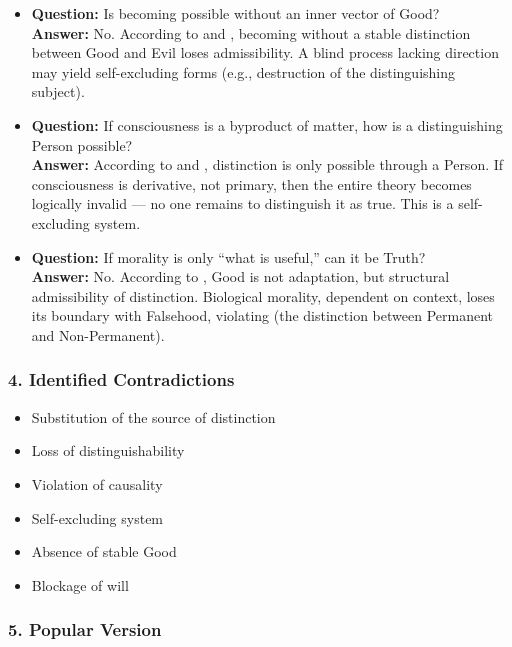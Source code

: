\documentclass[12pt]{article}
\begin{document}
\begin{itemize}
\item \textbf{Question:} Is becoming possible without an inner vector of Good?\\
\textbf{Answer:} No. According to \text{[4.3]} and \text{[11.2.3]}, becoming without a stable distinction between Good and Evil loses admissibility. A blind process lacking direction may yield self-excluding forms (e.g., destruction of the distinguishing subject).

\item \textbf{Question:} If consciousness is a byproduct of matter, how is a distinguishing Person possible?\\
\textbf{Answer:} According to \text{[10.4]} and \text{[5.1]}, distinction is only possible through a Person. If consciousness is derivative, not primary, then the entire theory becomes logically invalid — no one remains to distinguish it as true. This is a self-excluding system.

\item \textbf{Question:} If morality is only ``what is useful,'' can it be Truth?\\
\textbf{Answer:} No. According to \text{[11.2.3]}, Good is not adaptation, but structural admissibility of distinction. Biological morality, dependent on context, loses its boundary with Falsehood, violating \text{[4.4]} (the distinction between Permanent and Non-Permanent).
\end{itemize}

\subsubsection*{4. Identified Contradictions}

\begin{itemize}
\item Substitution of the source of distinction
\item Loss of distinguishability
\item Violation of causality
\item Self-excluding system
\item Absence of stable Good
\item Blockage of will
\end{itemize}

\subsubsection*{5. Popular Version}
\end{document}
